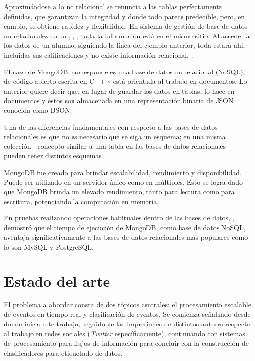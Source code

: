 Aproximándose a lo no relacional se renuncia a las tablas perfectamente definidas, que garantizan la integridad y donde todo parece predecible, pero, en cambio, se obtiene rapidez y flexibilidad. En sistema de gestión de base de datos no relacionales como \cite{CassandraNOSQL}, \cite{redisNOSQL}, \cite{MongoDB}, toda la información está en el mismo sitio. Al acceder a los datos de un alumno, siguiendo la línea del ejemplo anterior, toda estará ahi, incluidas sus calificaciones y no existe información relacional, \cite{BDNOSQL}.

El caso de MongoDB, corresponde es una base de datos no relacional (NoSQL), de código abierto escrita en C++ y está orientada al trabajo en documentos. Lo anterior quiere decir que, en lugar de guardar los datos en tablas, lo hace en documentos y éstos son almacenada en una representación binaria de JSON conocida como BSON.

Una de las diferencias fundamentales con respecto a las bases de datos relacionales es que no es necesario que se siga un esquema; en una misma colección - concepto similar a una tabla en las bases de datos relacionales - pueden tener distintos esquemas.

MongoDB fue creado para brindar escalabilidad, rendimiento y disponibilidad. Puede ser utilizado en un servidor único como en múltiples. Esto se logra dado que MongoDB brinda un elevado rendimiento, tanto para lectura como para escritura, potenciando la computación en memoria, \cite{MongoDB}.

En pruebas realizando operaciones habituales dentro de las bases de datos, \cite{MongoPerformance}, demostró que el tiempo de ejecución de MongoDB, como base de datos NoSQL, aventaja significativamente a las bases de datos relacionales más populares como lo son MySQL y PostgreSQL.

\section{Estado del arte}
\label{intro:motivacion:arte}

El problema a abordar consta de dos tópicos centrales: el procesamiento escalable de eventos en tiempo real y clasificación de eventos. Se comienza señalando desde donde inicia este trabajo, seguido de las impresiones de distintos autores respecto al trabajo en redes sociales (\textit{Twitter} específicamente), continuando con sistemas de procesamiento para flujos de información para concluir con la construcción de clasificadores para etiquetado de datos.

